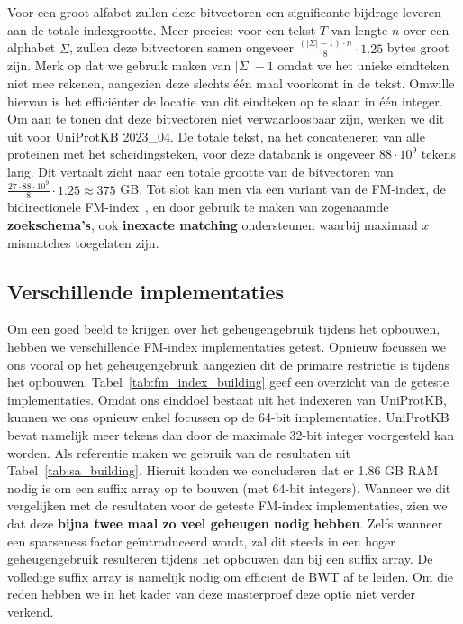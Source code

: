 Voor een groot alfabet zullen deze bitvectoren een significante bijdrage leveren aan de totale indexgrootte.
Meer precies: voor een tekst $T$ van lengte $n$ over een alphabet $\Sigma$, zullen deze bitvectoren samen ongeveer $\frac{(|\Sigma| - 1) \cdot n}{8} \cdot 1.25$ bytes groot zijn.
Merk op dat we gebruik maken van $|\Sigma| - 1$ omdat we het unieke eindteken niet mee rekenen, aangezien deze slechts één maal voorkomt in de tekst.
Omwille hiervan is het efficiënter de locatie van dit eindteken op te slaan in één integer.
Om aan te tonen dat deze bitvectoren niet verwaarloosbaar zijn, werken we dit uit voor UniProtKB 2023\_04.
De totale tekst, na het concateneren van alle proteïnen met het scheidingsteken, voor deze databank is ongeveer $88 \cdot 10^9$ tekens lang.
Dit vertaalt zicht naar een totale grootte van de bitvectoren van $\frac{27 \cdot 88 \cdot 10^9}{8} \cdot 1.25 \approx 375$ GB\@.
Tot slot kan men via een variant van de FM-index, de bidirectionele FM-index~\cite{bi-directional_fm_index}, en door gebruik te maken van zogenaamde \textbf{zoekschema's}, ook \textbf{inexacte matching} ondersteunen waarbij maximaal $x$ mismatches toegelaten zijn.

\subsection{Verschillende implementaties}\label{subsec:verschillende-implementaties}
Om een goed beeld te krijgen over het geheugengebruik tijdens het opbouwen, hebben we verschillende FM-index implementaties getest.
Opnieuw focussen we ons vooral op het geheugengebruik aangezien dit de primaire restrictie is tijdens het opbouwen.
Tabel~\ref{tab:fm_index_building} geef een overzicht van de geteste implementaties.
Omdat ons einddoel bestaat uit het indexeren van UniProtKB, kunnen we ons opnieuw enkel focussen op de 64-bit implementaties.
UniProtKB bevat namelijk meer tekens dan door de maximale 32-bit integer voorgesteld kan worden.
Als referentie maken we gebruik van de resultaten uit Tabel~\ref{tab:sa_building}.
Hieruit konden we concluderen dat er 1.86 GB RAM nodig is om een suffix array op te bouwen (met 64-bit integers).
Wanneer we dit vergelijken met de resultaten voor de geteste FM-index implementaties, zien we dat deze \textbf{bijna twee maal zo veel geheugen nodig hebben}.
Zelfs wanneer een sparseness factor geïntroduceerd wordt, zal dit steeds in een hoger geheugengebruik resulteren tijdens het opbouwen dan bij een suffix array.
De volledige suffix array is namelijk nodig om efficiënt de BWT af te leiden.
Om die reden hebben we in het kader van deze masterproef deze optie niet verder verkend.

